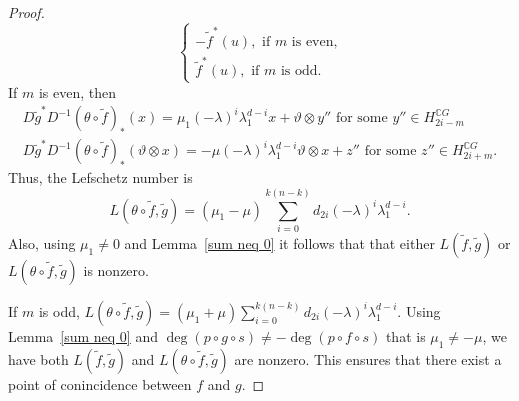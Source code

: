\documentclass{amsart}
\newcommand{\lemref}[1]{Lemma~\ref{#1}}
\newcommand{\remref}[1]{Remark~\ref{#1}}
\begin{document}
\begin{proof}
$$\begin{cases}
		-\tilde  f^*(u), \text{ if } m \text{ is even,}\\
		\tilde  f^*(u), \text{ if } m \text{ is odd}.
	\end{cases}$$ 
	If $m$ is even, %
then  
	\begin{equation*}\label{D with theta}
		\begin{split}
			D\tilde g^* D^{-1} (\theta\circ \tilde f)_*(x)=\mu_1(- \lambda)^i\lambda_1^{d-i} x + \vartheta\otimes y''\text{ for some }y'' \in H^{\mathbb CG}_{2i-m} \\
			D\tilde g^* D^{-1} (\theta\circ \tilde f)_*(\vartheta\otimes x)= -\mu (-\lambda)^i\lambda_1^{d-i}\vartheta\otimes x+z'' \text{ for some }z''\in H_{2i+m}^{\mathbb CG}.
		\end{split}
	\end{equation*}
	Thus, %
the Lefschetz number is
	\begin{equation*}\label{L(theta f,g)}
		L(\theta \circ\tilde f,\tilde g) =(\mu_1 - \mu)\sum_{i=0}^{k(n-k)} d_{2i} (-\lambda)^i\lambda_1^{d-i}.
	\end{equation*}
	Also, using  $\mu_1\neq 0$ and \lemref{sum neq 0}  it follows that that either $L(\tilde f, \tilde g)$ or $L(\theta\circ \tilde f,\tilde g)$ is nonzero. 
	
	If $m$ is odd, $	L(\theta \circ\tilde f,\tilde g) =(\mu_1 + \mu)\sum_{i=0}^{k(n-k)} d_{2i} (-\lambda)^i\lambda_1^{d-i}.$ Using  \lemref{sum neq 0} and $\deg(p\circ g \circ s)\neq -\deg (p\circ f\circ s)$ that is $\mu_1 \neq -\mu$, we have both $L(\tilde{f},\tilde{g})$ and $L(\theta \circ\tilde f,\tilde g)$ are nonzero. 
	This ensures that there exist a point of conincidence between $f $ and $g$.
\end{proof}
\end{document}
